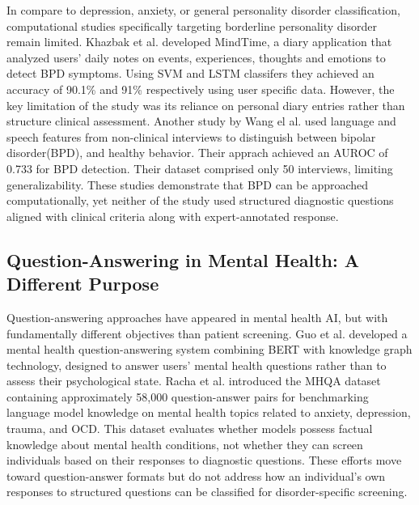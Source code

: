 \documentclass{article}
\begin{document}
In compare to depression, anxiety, or general personality disorder classification, computational studies specifically targeting borderline personality disorder remain limited. Khazbak et al. \cite{khazbak2021mindtime} developed MindTime, a diary application that analyzed users' daily notes on events, experiences, thoughts and emotions to detect BPD symptoms. Using SVM and LSTM classifers they achieved an accuracy of 90.1\% and 91\% respectively using user specific data. However, the key limitation of the study was its reliance on personal diary entries rather than structure clinical assessment. Another study by Wang  el al. \cite{wang2020learning} used language and speech features from non-clinical interviews to distinguish between bipolar disorder(BPD), and healthy behavior. Their apprach achieved an AUROC of 0.733 for BPD detection. Their dataset comprised only 50 interviews, limiting generalizability. These studies demonstrate that BPD can be approached computationally, yet neither of the study used structured diagnostic questions aligned with clinical criteria along with expert-annotated response.














\subsection{Question-Answering in Mental Health: A Different Purpose}

Question-answering approaches have appeared in mental health AI, but with fundamentally different objectives than patient screening. Guo et al. \cite{guo2021mental} developed a mental health question-answering system combining BERT with knowledge graph technology, designed to answer users' mental health questions rather than to assess their psychological state. Racha et al. \cite{racha2025mhqa} introduced the MHQA dataset containing approximately 58,000 question-answer pairs for benchmarking language model knowledge on mental health topics related to anxiety, depression, trauma, and OCD. This dataset evaluates whether models possess factual knowledge about mental health conditions, not whether they can screen individuals based on their responses to diagnostic questions. These efforts move toward question-answer formats but do not address how an individual's own responses to structured questions can be classified for disorder-specific screening.
\end{document}
